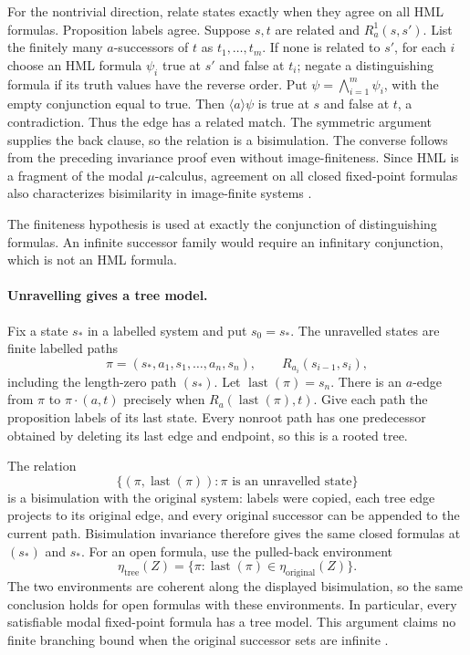 For the nontrivial direction, relate states exactly
when they agree on all HML formulas. Proposition
labels agree. Suppose \(s,t\) are related and
\(R_a^1(s,s')\). List the finitely many
\(a\)-successors of \(t\) as \(t_1,\ldots,t_m\).
If none is related to \(s'\), for each \(i\)
choose an HML formula \(\psi_i\) true at \(s'\)
and false at \(t_i\); negate a distinguishing
formula if its truth values have the reverse order.
Put \(\psi=\bigwedge_{i=1}^{m}\psi_i\), with the
empty conjunction equal to true. Then
\(\langle a\rangle\psi\) is true at \(s\)
and false at \(t\), a contradiction.
Thus the edge has a related match.
The symmetric argument supplies the back clause,
so the relation is a bisimulation.
The converse follows from the preceding invariance
proof even without image-finiteness.
Since HML is a fragment of the modal \(\mu\)-calculus,
agreement on all closed fixed-point formulas also
characterizes bisimilarity in image-finite systems
\cite[\S4.2, thm.~4.3]{BradfieldStirling2007}.

The finiteness hypothesis is used at exactly the
conjunction of distinguishing formulas. An infinite
successor family would require an infinitary
conjunction, which is not an HML formula.

\paragraph{Unravelling gives a tree model.}
Fix a state \(s_*\) in a labelled system and put \(s_0=s_*\).
The unravelled states are finite labelled paths
\[
 \pi=(s_*,a_1,s_1,\ldots,a_n,s_n),
 \qquad R_{a_i}(s_{i-1},s_i),
\]
including the length-zero path \((s_*)\).
Let \(\operatorname{last}(\pi)=s_n\).
There is an \(a\)-edge from \(\pi\) to
\(\pi\cdot(a,t)\) precisely when
\(R_a(\operatorname{last}(\pi),t)\).
Give each path the proposition labels of its last
state. Every nonroot path has one predecessor
obtained by deleting its last edge and endpoint,
so this is a rooted tree.

The relation
\[
 \{(\pi,\operatorname{last}(\pi)):\pi
                        \text{ is an unravelled state}\}
\]
is a bisimulation with the original system:
labels were copied, each tree edge projects to
its original edge, and every original successor
can be appended to the current path.
Bisimulation invariance therefore gives the same
closed formulas at \((s_*)\) and \(s_*\).
For an open formula, use the pulled-back environment
\[
 \eta_{\mathrm{tree}}(Z)
   =\{\pi:\operatorname{last}(\pi)\in\eta_{\mathrm{original}}(Z)\}.
\]
The two environments are coherent along the displayed
bisimulation, so the same conclusion holds for
open formulas with these environments.
In particular, every satisfiable modal fixed-point
formula has a tree model. This argument claims no
finite branching bound when the original successor
sets are infinite \cite[\S4.2, prop.~4.4]{BradfieldStirling2007}.

